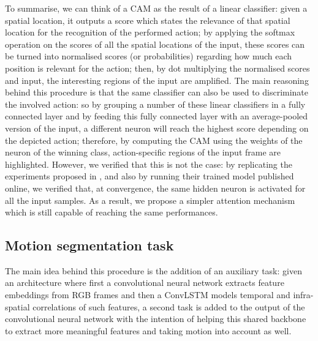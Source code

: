 \documentclass[10pt,twocolumn,letterpaper]{article}
\begin{document}
To summarise, we can think of a CAM as the result of a linear classifier: given a spatial location, it outputs a score which states the relevance of that spatial location for the recognition of the performed action; by applying the softmax operation on the scores of all the spatial locations of the input, these scores can be turned into normalised scores (or probabilities) regarding how much each position is relevant for the action; then, by dot multiplying the normalised scores and input, the interesting regions of the input are amplified. The main reasoning behind this procedure is that the same classifier can also be used to discriminate the involved action: so by grouping a number of these linear classifiers in a fully connected layer and by feeding this fully connected layer with an average-pooled version of the input, a different neuron will reach the highest score depending on the depicted action; therefore, by computing the CAM using the weights of the neuron of the winning class, action-specific regions of the input frame are highlighted. However, we verified that this is not the case: by replicating the experiments proposed in \cite{Ego-RNN}, and also by running their trained model published online, we verified that, at convergence, the same hidden neuron is activated for all the input samples. As a result, we propose a simpler attention mechanism which is still capable of reaching the same performances.


\subsection{Motion segmentation task}
\label{par:ms_task}
The main idea behind this procedure is the addition of an auxiliary task: given an architecture where first a convolutional neural network extracts feature embeddings from RGB frames and then a ConvLSTM models temporal and infra-spatial correlations of such features, a second task is added to the output of the convolutional neural network with the intention of helping this shared backbone to extract more meaningful features and taking motion into account as well.
\end{document}
